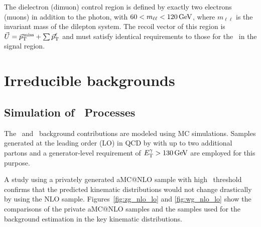 The dielectron (dimuon) control region is defined by exactly two electrons (muons) in addition to the photon, with $60 < m_{\ell\ell} < 120\,\text{Ge\hspace{-.08em}V}$, where $m_{\ell\ell}$ is the invariant mass of the dilepton system. 
The recoil vector of this region is $\vec{U} = {\vec p}_{\mathrm{T}}^{\kern1pt\text{miss}} + \sum{\vec p}_{\mathrm{T}}^{\ell}$ and must satisfy identical requirements to those for the \ptvecmiss\ in the signal region.

\section{Irreducible backgrounds}
\label{sec:irreducible}

\subsection{Simulation of \vg\ Processes}
\label{subsec:vgmc}

The \zinvg\ and \wlng\ background contributions are modeled using MC simulations.
Samples generated at the leading order (LO) in QCD by  with up to two additional partons and a generator-level requirement of $E_{\mathrm{T}}^{\gamma} > 130\,\text{Ge\hspace{-.08em}V}$ are employed for this purpose.

A study using a privately generated aMC@NLO sample with high \ETg\ threshold confirms that the predicted kinematic distributions would not change drastically by using the NLO sample. 
Figures~\ref{fig:zg_nlo_lo} and \ref{fig:wg_nlo_lo} show the comparisons of the private aMC@NLO samples and the  samples used for the background estimation in the key kinematic distributions.

